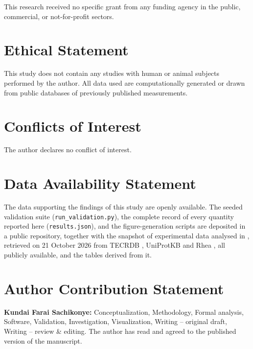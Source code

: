 \documentclass[11pt,a4paper]{article}
\theoremstyle{pstyle}
\theoremstyle{definition}
\theoremstyle{remark}
\begin{document}
This research received no specific grant from any funding agency in the
public, commercial, or not-for-profit sectors.

\section*{Ethical Statement}

This study does not contain any studies with human or animal subjects
performed by the author. All data used are computationally generated or
drawn from public databases of previously published measurements.

\section*{Conflicts of Interest}

The author declares no conflict of interest.

\section*{Data Availability Statement}

The data supporting the findings of this study are openly available.
The seeded validation suite (\texttt{run\_validation.py}), the complete
record of every quantity reported here (\texttt{results.json}), and the
figure-generation scripts are deposited in a public repository,
together with the snapshot of experimental data analysed in
, retrieved on 21 October 2026 from TECRDB
\citep{goldberg2004}, UniProtKB \citep{uniprot2025} and Rhea
\citep{bansal2022}, all publicly available, and the tables derived from
it.

\section*{Author Contribution Statement}

\textbf{Kundai Farai Sachikonye:} Conceptualization, Methodology,
Formal analysis, Software, Validation, Investigation, Visualization,
Writing -- original draft, Writing -- review \& editing. The author
has read and agreed to the published version of the manuscript.



\end{document}
